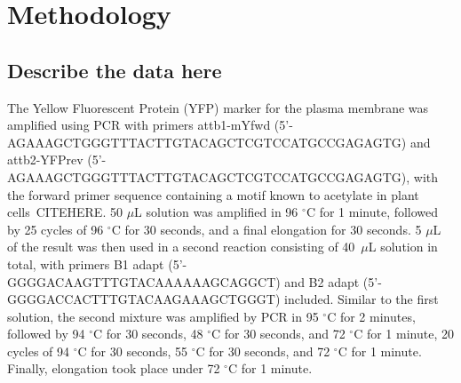 
\chapter{Methodology}

\ifpdf
\graphicspath{{Chapter2/Figs/Raster/}{Chapter2/Figs/PDF/}{Chapter2/Figs/}}
\else
\graphicspath{{Chapter2/Figs/Vector/}{Chapter2/Figs/}}
\fi

\section[Raw data]{Describe the data here}
The Yellow Fluorescent Protein (YFP) marker for the plasma membrane was
amplified using PCR with primers attb1-mYfwd
(5'-AGAAAGCTGGGTTTACTTGTACAGCTCGTCCATGCCGAGAGTG) and attb2-YFPrev
(5'-AGAAAGCTGGGTTTACTTGTACAGCTCGTCCATGCCGAGAGTG), with the forward primer
sequence containing a motif known to acetylate in plant cells~CITEHERE. 50
$\mu$L solution was amplified in 96 $^\circ$C for 1 minute, followed by 25
cycles of 96 $^\circ$C for 30 seconds, and a final elongation for 30 seconds. 5
$\mu$L of the result was then used in a second reaction consisting of
40~$\mu$L solution in total, with primers B1 adapt (5'-GGGGACAAGTTTGTACAAAAAAGCAGGCT)
and B2 adapt (5'-GGGGACCACTTTGTACAAGAAAGCTGGGT) included. Similar to the first
solution, the second mixture was amplified by PCR in 95 $^\circ$C for 2 minutes,
followed by 94 $^\circ$C for 30 seconds, 48 $^\circ$C for 30 seconds, and 72
$^\circ$C for 1 minute, 20 cycles of 94 $^\circ$C for 30 seconds,
55 $^\circ$C for 30 seconds, and 72 $^\circ$C for 1 minute. Finally, elongation
took place under 72 $^\circ$C for 1 minute.




